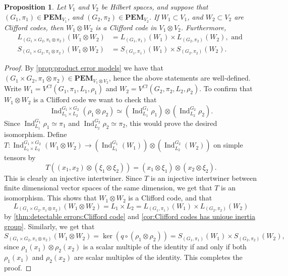 \documentclass[11pt, oneside, reqno]{amsart}
\newcommand{\PEM}{\mathbf{PEM}}
\newcommand{\Ind}{\operatorname{Ind}}
\theoremstyle{definition}
\theoremstyle{plain}
\newtheorem{proposition}[definition]{Proposition}
\theoremstyle{remark}
\begin{document}
\begin{proposition}\label{prop:product code}
    Let $V_1$ and $V_2$ be Hilbert spaces, and suppose that $(G_1,\pi_1) \in \PEM_{V_1}$, and $(G_2,\pi_2) \in \PEM_{V_2}$. If $W_1 \subset V_1$, and $W_2 \subset V_2$ are Clifford codes, then $W_1 \otimes W_2$ is a Clifford code in $V_1 \otimes V_2$. Furthermore,
    \begin{align*}
        L_{(G_1 \times G_2, \pi_1 \otimes \pi_2)}(W_1 \otimes W_2) & = L_{(G_1, \pi_1)}(W_1) \times L_{(G_2, \pi_2)}(W_2), \text{ and } \\
        S_{(G_1 \times G_2, \pi_1 \otimes \pi_2)}(W_1 \otimes W_2) & = S_{(G_1, \pi_1)}(W_1) \times S_{(G_2, \pi_2)}(W_2).
    \end{align*}
\end{proposition}
\begin{proof}
    By \cref{prop:product error models} we have that $(G_1 \times G_2, \pi_1 \otimes \pi_2) \in \PEM_{V_1 \otimes V_2}$, hence the above statements are well-defined. Write $W_1 = V^{Cl}(G_1,\pi_1,L_1,\rho_1)$ and $W_2 = V^{Cl}(G_2,\pi_2,L_2,\rho_2)$. To confirm that $W_1 \otimes W_2$ is a Clifford code we want to check that
    \begin{equation*}
        \Ind_{L_1 \times L_2}^{G_1 \times G_2}(\rho_1 \otimes \rho_2) \simeq (\Ind_{L_1}^{G_1}\rho_1) \otimes (\Ind_{L_2}^{G_2}\rho_2).
    \end{equation*}
    Since $\Ind_{L_1}^{G_1}\rho_1 \simeq \pi_1$ and $\Ind_{L_2}^{G_2}\rho_2 \simeq \pi_2$, this would prove the desired isomorphism. Define $T \colon \Ind_{L_1 \times L_2}^{G_1 \times G_2}(W_1 \otimes W_2) \to (\Ind_{L_1}^{G_1}(W_1)) \otimes (\Ind_{L_2}^{G_2}(W_2))$ on simple tensors by
    \begin{equation*}
        T((x_1,x_2)\otimes (\xi_1 \otimes \xi_2))
        = (x_1 \otimes \xi_1) \otimes (x_2 \otimes \xi_2).
    \end{equation*}
    This is clearly an injective intertwiner. Since $T$ is an injective intertwiner between finite dimensional vector spaces of the same dimension, we get that $T$ is an isomorphism. This shows that $W_1 \otimes W_2$ is a Clifford code, and that
    \begin{equation*}
        L_{(G_1 \times G_2, \pi_1 \otimes \pi_2)}(W_1 \otimes W_2) = L_1 \times L_2 = L_{(G_1, \pi_1)}(W_1) \times L_{(G_2, \pi_2)}(W_2)
    \end{equation*}
    by \cref{thm:detectable errors:Clifford code} and \cref{cor:Clifford codes has unique inertia group}. Similarly, we get that
    \begin{equation*}
        S_{(G_1 \times G_2, \pi_1 \otimes \pi_2)}(W_1 \otimes W_2) = \ker(q\circ(\rho_1 \otimes \rho_2)) = S_{(G_1, \pi_1)}(W_1) \times S_{(G_2, \pi_2)}(W_2),
    \end{equation*}
    since $\rho_1(x_1) \otimes \rho_2(x_2)$ is a scalar multiple of the identity if and only if both $\rho_1(x_1)$ and $\rho_2(x_2)$ are scalar multiples of the identity. This completes the proof.
\end{proof}
\end{document}
